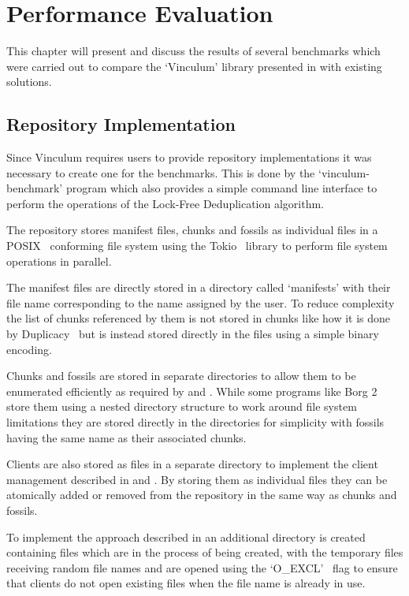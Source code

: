 \chapter{Performance Evaluation}\label{ch:evaluation}

This chapter will present and discuss the results of several benchmarks which
were carried out to compare the `Vinculum' library presented in 
with existing solutions.

\section{Repository Implementation}\label{sec:repo-implementation}

Since Vinculum requires users to provide repository implementations it was
necessary to create one for the benchmarks.
This is done by the `vinculum-benchmark' program which also provides a simple
command line interface to perform the operations of the Lock-Free Deduplication
algorithm.

The repository stores manifest files, chunks and fossils as individual files
in a POSIX~\cite{Posix} conforming file system using the Tokio~\cite{Tokio}
library to perform file system operations in parallel.

The manifest files are directly stored in a directory called `manifests' with their
file name corresponding to the name assigned by the user.
To reduce complexity the list of chunks referenced by them is not stored
in chunks like how it is done by Duplicacy~\cite[section `Naming Chunks']{Duplicacy}
but is instead stored directly in the files using a simple binary encoding.

Chunks and fossils are stored in separate directories to allow them to be
enumerated efficiently as required by  and
.
While some programs like Borg 2~\cite[section `Internals']{Borg2} store them
using a nested directory structure to work around file system limitations they
are stored directly in the directories for simplicity with fossils having the
same name as their associated chunks.

Clients are also stored as files in a separate directory to implement the client
management described in  and .
By storing them as individual files they can be atomically added or removed from
the repository in the same way as chunks and fossils.

To implement the approach described in  an additional
directory is created containing files which are in the process of being created,
with the temporary files receiving random file names and are opened using the
`O\_EXCL'~\cite{Posix} flag to ensure that clients do not open existing files
when the file name is already in use.

